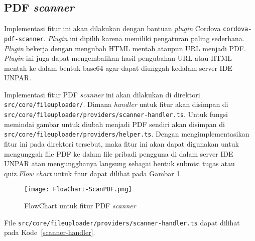 \subsection{PDF \textit{scanner}}
Implementasi fitur ini akan dilakukan dengan bantuan \textit{plugin} Cordova \texttt{cordova-pdf-scanner}. \textit{Plugin} ini dipilih karena memiliki pengaturan paling sederhana. \textit{Plugin} bekerja dengan mengubah HTML mentah ataupun URL menjadi PDF. \textit{Plugin} ini juga dapat mengembalikan hasil pengubahan URL atau HTML mentah ke dalam bentuk base64 agar dapat diunggah kedalam server IDE UNPAR. 

Implementasi fitur PDF \textit{scanner} ini akan dilakukan di direktori \texttt{src/core/fileuploader/}. Dimana \textit{handler} untuk fitur akan disimpan di \texttt{src/core/fileuploader/providers/scanner-handler.ts}. Untuk fungsi memindai gambar untuk diubah menjadi PDF sendiri akan disimpan di \\ \texttt{src/core/fileuploader/providers/helper.ts}. Dengan mengimplementasikan fitur ini pada direktori tersebut, maka fitur ini akan dapat digunakan untuk mengunggah file PDF ke dalam file pribadi pengguna di dalam server IDE UNPAR atau mengungghanya langsung sebagai bentuk submisi tugas atau quiz.\textit{Flow chart} untuk fitur dapat dilihat pada Gambar \ref{fig:scan:flowchart}. 

\begin{figure}[H] 
	\centering  
	\texttt{[image: FlowChart-ScanPDF.png]}  
	\caption[FlowChart untuk fitur PDF \textit{scanner}] {FlowChart untuk fitur PDF \textit{scanner}} 
	\label{fig:scan:flowchart} 
\end{figure} 

File \texttt{src/core/fileuploader/providers/scanner-handler.ts} dapat dilihat pada \mbox{Kode \ref{scanner-handler}}. 

